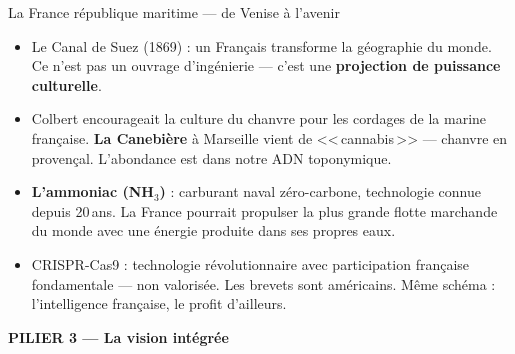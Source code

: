 \documentclass[a4paper,11pt]{article}
\begin{document}
\begin{fichevert}{La France r\'{e}publique maritime --- de Venise \`{a} l'avenir}
\begin{itemize}[nosep, label=\color{ModeVert}]
  \item Le Canal de Suez (1869) : un Fran\c{c}ais transforme la g\'{e}ographie du monde. Ce n'est pas un ouvrage d'ing\'{e}nierie --- c'est une \textbf{projection de puissance culturelle}.
  \item Colbert encourageait la culture du chanvre pour les cordages de la marine fran\c{c}aise. \textbf{La Canebi\`{e}re} \`{a} Marseille vient de <<\,cannabis\,>> --- chanvre en proven\c{c}al. L'abondance est dans notre ADN toponymique.
  \item \textbf{L'ammoniac (NH$_3$)} : carburant naval z\'{e}ro-carbone, technologie connue depuis 20\,ans. La France pourrait propulser la plus grande flotte marchande du monde avec une \'{e}nergie produite dans ses propres eaux.
  \item CRISPR-Cas9 : technologie r\'{e}volutionnaire avec participation fran\c{c}aise fondamentale --- non valoris\'{e}e. Les brevets sont am\'{e}ricains. M\^{e}me sch\'{e}ma : l'intelligence fran\c{c}aise, le profit d'ailleurs.
\end{itemize}

\vspace{0.3cm}
\textbf{\color{ModeVert}PILIER 3 --- La vision int\'{e}gr\'{e}e}

\begin{center}
\end{center}
\end{fichevert}
\end{document}
